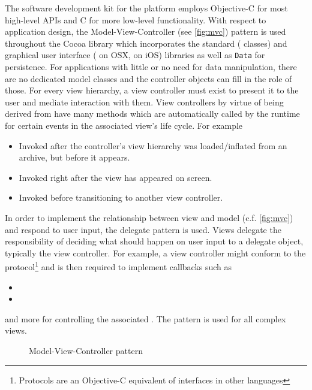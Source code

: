 The software development kit for the platform employs Objective-C for most
high-level APIs and C for more low-level functionality. With respect to
application design, the Model-View-Controller (see \autoref{fig:mvc}) pattern is
used throughout the Cocoa library which incorporates the standard
( classes) and graphical user interface ( on OSX,
 on iOS) libraries as well as  \texttt{Data} for
persistence. For applications with little or no need for data manipulation,
there are no dedicated model classes and the controller objects can fill in the
role of those.  For every view hierarchy, a view
controller must exist to present it to the user and mediate interaction with
them. View controllers by virtue of being derived from 
have many methods which are automatically called by the runtime for certain
events in the associated view's life cycle. For example
\begin{itemize}[align=left]
   \item[\code{viewDidLoad}] Invoked after the controller's view hierarchy was
      loaded/inflated from an archive, but before it appears.
   \item[\code{viewDidAppear}] Invoked right after the view has appeared on
      screen.
   \item[\code{prepareForSegue}] Invoked before transitioning to another view
      controller.
\end{itemize}

In order to implement the relationship between view and model (c.f.
\autoref{fig:mvc}) and respond to user input, the delegate pattern \citep[ch.
1.6]{gamma1995} is used. Views delegate the responsibility of deciding what
should happen on user input to a delegate object, typically the view controller.
For example, a view controller might conform to the 
protocol\footnote{Protocols are an Objective-C equivalent of interfaces in other
languages} and is then required to implement callbacks such as
\begin{itemize}
   \item {}
   \item {}
\end{itemize}
and more for controlling the associated . The pattern is used
for all complex views.

\begin{figure}[h]
   {\centering      
      
      \caption{Model-View-Controller pattern}
   \label{fig:mvc}}
\end{figure}


